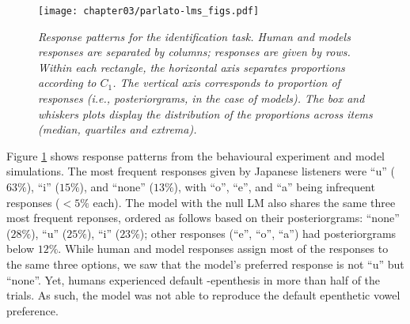 {\begin{figure}[htb!]
    \centering
    \texttt{[image: chapter03/parlato-lms\_figs.pdf]}
    \caption{\textit{Response patterns for the identification task. Human and models responses are separated by columns; responses are given by rows. Within each rectangle, the horizontal axis separates proportions according to $C_{1}$. The vertical axis corresponds to proportion of responses (i.e., posteriorgrams, in the case of models). The box and whiskers plots display the distribution of the proportions across items (median, quartiles and extrema).}}
    \label{fig:parlato-lms}
  \end{figure}
 
Figure \ref{fig:parlato-lms} shows response patterns from the behavioural experiment and model simulations. The most frequent responses given by Japanese listeners were ``u'' ($63\%$), ``i'' ($15\%$), and ``none'' ($13\%$), with ``o'', ``e'', and ``a'' being infrequent responses ($<5\%$ each). The model with the null LM also shares the same three most frequent reponses, ordered as follows based on their posteriorgrams: ``none'' ($28\%$), ``u'' ($25\%$), ``i'' ($23\%$); other responses (``e'', ``o'', ``a'') had posteriorgrams below $12\%$. While human and model responses assign most of the responses to the same three options, we saw that the model's preferred response is not ``u'' but ``none''. Yet, humans experienced default -epenthesis in more than half of the trials. As such, the model was not able to reproduce the default epenthetic vowel preference.          




}
